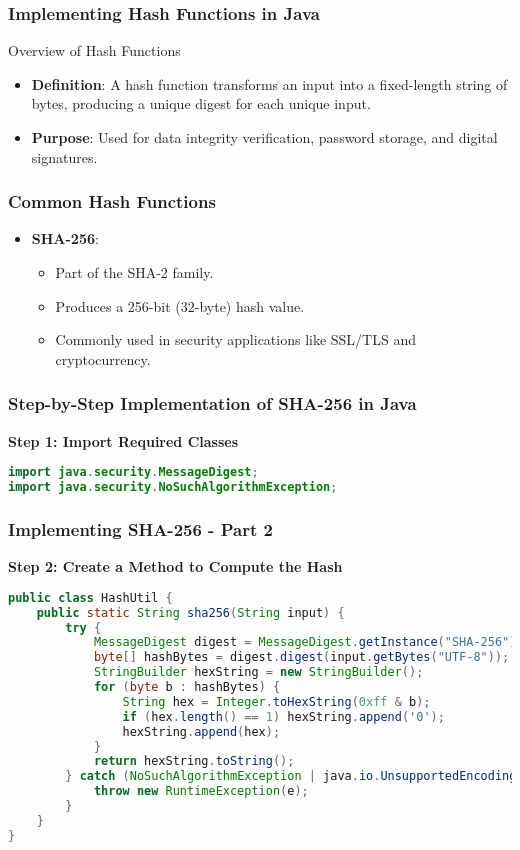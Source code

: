 \documentclass{beamer}
\begin{document}
\begin{frame}
    \frametitle{Implementing Hash Functions in Java}
    \begin{block}{Overview of Hash Functions}
        \begin{itemize}
            \item \textbf{Definition}: A hash function transforms an input into a fixed-length string of bytes, producing a unique digest for each unique input.
            \item \textbf{Purpose}: Used for data integrity verification, password storage, and digital signatures.
        \end{itemize}
    \end{block}
\end{frame}

\begin{frame}
    \frametitle{Common Hash Functions}
    \begin{itemize}
        \item \textbf{SHA-256}:
        \begin{itemize}
            \item Part of the SHA-2 family.
            \item Produces a 256-bit (32-byte) hash value.
            \item Commonly used in security applications like SSL/TLS and cryptocurrency.
        \end{itemize}
    \end{itemize}
\end{frame}

\begin{frame}[fragile]
    \frametitle{Step-by-Step Implementation of SHA-256 in Java}
    \textbf{Step 1: Import Required Classes}
    \begin{lstlisting}[language=Java]
import java.security.MessageDigest;
import java.security.NoSuchAlgorithmException;
    \end{lstlisting}
\end{frame}

\begin{frame}[fragile]
    \frametitle{Implementing SHA-256 - Part 2}
    \textbf{Step 2: Create a Method to Compute the Hash}
    \begin{lstlisting}[language=Java]
public class HashUtil {
    public static String sha256(String input) {
        try {
            MessageDigest digest = MessageDigest.getInstance("SHA-256");
            byte[] hashBytes = digest.digest(input.getBytes("UTF-8"));
            StringBuilder hexString = new StringBuilder();
            for (byte b : hashBytes) {
                String hex = Integer.toHexString(0xff & b);
                if (hex.length() == 1) hexString.append('0');
                hexString.append(hex);
            }
            return hexString.toString(); 
        } catch (NoSuchAlgorithmException | java.io.UnsupportedEncodingException e) {
            throw new RuntimeException(e);
        }
    }
}
    \end{lstlisting}
\end{frame}
\end{document}
